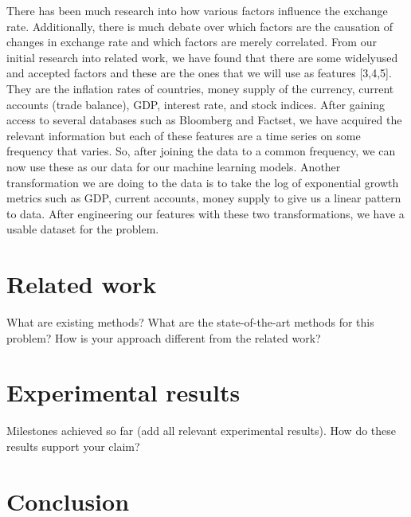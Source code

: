 \documentclass[twoside]{article}
\begin{document}
There has been much research into how various factors influence the exchange rate. Additionally, there is much debate over which factors are the causation of changes in exchange rate and which factors are merely correlated. From our initial research into related work, we have found that there are some widely­used and accepted factors and these are the ones that we will use as features [3,4,5]. They are the inflation rates of countries, money supply of the currency, current accounts (trade balance), GDP, interest rate, and stock indices. After gaining access to several databases such as Bloomberg and Factset, we have acquired the relevant information but each of these features are a time series on some frequency that varies. So, after joining the data to a common frequency, we can now use these as our data for our machine learning models. Another transformation we are doing to the data is to take the log of exponential growth metrics such as GDP, current accounts, money supply to give us a linear pattern to data.  After engineering our features with these two transformations, we have a usable dataset for the problem. 
\lipsum[4] %


\section{Related work}

What are existing methods? What are the state-of-the-art methods for this problem? How is your approach different from the related work?\\

\lipsum[5] %


\section{Experimental results}

Milestones achieved so far (add all relevant experimental results). How do these results support your claim?\\

\lipsum[5] %



\section{Conclusion}
\end{document}
